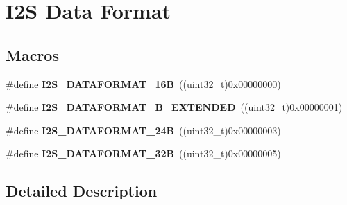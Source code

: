 \hypertarget{group___i2_s___data___format}{}\section{I2S Data Format}
\label{group___i2_s___data___format}
\subsection*{Macros}
\begin{DoxyCompactItemize}
\item 
\#define {\bfseries I2\+S\+\_\+\+D\+A\+T\+A\+F\+O\+R\+M\+A\+T\+\_\+16B}~((uint32\+\_\+t)0x00000000)\hypertarget{group___i2_s___data___format_ga84607e206fe566512a525b9f0e361142}{}\label{group___i2_s___data___format_ga84607e206fe566512a525b9f0e361142}

\item 
\#define {\bfseries I2\+S\+\_\+\+D\+A\+T\+A\+F\+O\+R\+M\+A\+T\+\_\+B\+\_\+\+E\+X\+T\+E\+N\+D\+ED}~((uint32\+\_\+t)0x00000001)\hypertarget{group___i2_s___data___format_ga7d247401de428096b986a1c88e494d71}{}\label{group___i2_s___data___format_ga7d247401de428096b986a1c88e494d71}

\item 
\#define {\bfseries I2\+S\+\_\+\+D\+A\+T\+A\+F\+O\+R\+M\+A\+T\+\_\+24B}~((uint32\+\_\+t)0x00000003)\hypertarget{group___i2_s___data___format_ga32b56d268efb591d0dfd437c68e21819}{}\label{group___i2_s___data___format_ga32b56d268efb591d0dfd437c68e21819}

\item 
\#define {\bfseries I2\+S\+\_\+\+D\+A\+T\+A\+F\+O\+R\+M\+A\+T\+\_\+32B}~((uint32\+\_\+t)0x00000005)\hypertarget{group___i2_s___data___format_gac37d00c83e0bfc6dd21261cf94ff14c6}{}\label{group___i2_s___data___format_gac37d00c83e0bfc6dd21261cf94ff14c6}

\end{DoxyCompactItemize}


\subsection{Detailed Description}
